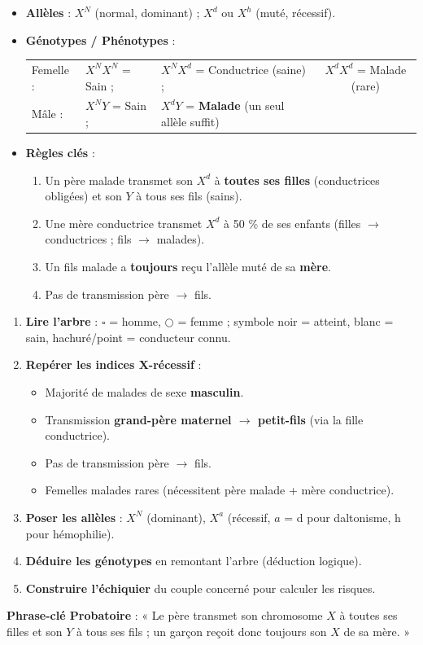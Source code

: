 \documentclass[11pt]{article}
\newcommand{\cle}[1]{{\popxbold\color{popdark}#1}}
\begin{document}
\begin{propriete}
\begin{itemize}
\item \textbf{Allèles} : $X^N$ (normal, dominant) ; $X^d$ ou $X^h$ (muté, récessif).
\item \textbf{Génotypes / Phénotypes} :
  \begin{tabular}{lllc}
  Femelle : & $X^N X^N$ = Sain ; & $X^N X^d$ = \cle{Conductrice} (saine) ; & $X^d X^d$ = Malade (rare) \\
  Mâle : & $X^N Y$ = Sain ; & $X^d Y$ = \textbf{Malade} (un seul allèle suffit)
  \end{tabular}
\item \textbf{Règles clés} :
  \begin{enumerate}
  \item Un père malade transmet son $X^d$ à \textbf{toutes ses filles} (conductrices obligées) et son $Y$ à tous ses fils (sains).
  \item Une mère conductrice transmet $X^d$ à 50 \% de ses enfants (filles $\rightarrow$ conductrices ; fils $\rightarrow$ malades).
  \item Un fils malade a \textbf{toujours} reçu l'allèle muté de sa \textbf{mère}.
  \item Pas de transmission père $\rightarrow$ fils.
  \end{enumerate}
\end{itemize}
\end{propriete}

\begin{methode}
\begin{enumerate}
\item \textbf{Lire l'arbre} : $\square$ = homme, $\bigcirc$ = femme ; symbole noir = atteint, blanc = sain, hachuré/point = conducteur connu.
\item \textbf{Repérer les indices X-récessif} :
  \begin{itemize}
  \item Majorité de malades de sexe \textbf{masculin}.
  \item Transmission \textbf{grand-père maternel $\rightarrow$ petit-fils} (via la fille conductrice).
  \item Pas de transmission père $\rightarrow$ fils.
  \item Femelles malades rares (nécessitent père malade + mère conductrice).
  \end{itemize}
\item \textbf{Poser les allèles} : $X^N$ (dominant), $X^a$ (récessif, $a$ = d pour daltonisme, h pour hémophilie).
\item \textbf{Déduire les génotypes} en remontant l'arbre (déduction logique).
\item \textbf{Construire l'échiquier} du couple concerné pour calculer les risques.
\end{enumerate}
\textbf{Phrase-clé Probatoire} : « Le père transmet son chromosome $X$ à toutes ses filles et son $Y$ à tous ses fils ; un garçon reçoit donc toujours son $X$ de sa mère. »
\end{methode}
\end{document}
